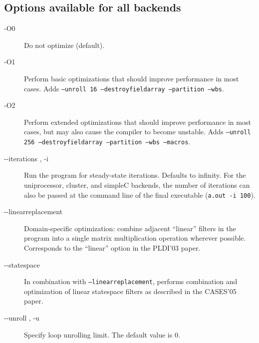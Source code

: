 \subsection*{Options available for all backends}
\begin{description}
\item [-O0]
Do not optimize (default).

\item [-O1]
Perform basic optimizations that should improve performance in most
cases. Adds \texttt{--unroll 16 --destroyfieldarray --partition --wbs}.

\item [-O2]
Perform extended optimizations that should improve performance in
most cases, but may also cause the compiler to become unstable.
Adds \texttt{--unroll 256 --destroyfieldarray --partition --wbs --macros}.

\item [-{}-iterations , -i]
Run the program for  steady-state iterations. Defaults to
infinity.  For the uniprocessor, cluster, and simpleC backends, the
number of iterations can also be passed at the command line of the
final executable (\texttt{a.out -i 100}).

\item [-{}-linearreplacement]
Domain-specific optimization: combine adjacent ``linear'' filters in
the program into a single matrix multiplication operation wherever
possible.  Corresponds to the ``linear'' option in the PLDI'03 paper.

\item [-{}-statespace]
In combination with \texttt{--linearreplacement}, performs combination
and optimization of linear statespace filters as described in the
CASES'05 paper.

\item [-{}-unroll , -u]
Specify loop unrolling limit. The default value is 0.
\end{description}
          
